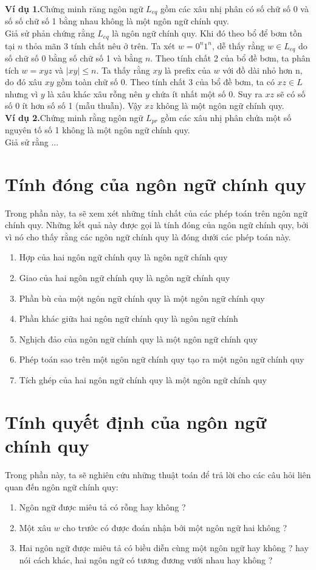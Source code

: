 \documentclass[14pt]{extreport}
\begin{document}
\textbf{Ví dụ 1.}Chứng minh răng ngôn ngữ $L_{eq}$ gồm các xâu nhị phân có số chữ số 0 và số số chữ số 1 bằng nhau không là một ngôn ngữ chính quy. \\
Giả sử phản chứng rằng $L_{eq}$ là ngôn ngữ chính quy. Khi đó theo bổ để bơm tồn tại $n$ thỏa mãn 3 tính chất nêu ở trên. Ta xét $w = 0^n 1^n$, dễ thấy rằng $w \in L_{eq}$ do số chữ số 0 bằng số chữ số 1 và bằng $n$. Theo tính chất 2 của bổ đề bơm, ta phân tích $w = xyz$ và $|xy| \leq n$. Ta thấy rằng $xy$ là prefix của $w$ với đồ dài nhỏ hơn n, do đó xâu $xy$ gồm toàn chữ số 0. Theo tính chất 3 của bổ đề bơm, ta có $xz \in L$ nhưng vì $y$ là xâu khác xâu rỗng nên $y$ chứa ít nhất một số 0. Suy ra $xz$ sẽ có số số 0 ít hơn số số 1 (mẫu thuẫn). Vậy $xz$ không là một ngôn ngữ chính quy.\\

\textbf{Ví dụ 2.}Chứng minh rằng ngôn ngữ $L_{pr}$ gồm các xâu nhị phân chứa một số nguyên tố số 1 không là một ngôn ngữ chính quy. \\
Giả sử rằng ... \\

\section{Tính đóng của ngôn ngữ chính quy}
Trong phần này, ta sẽ xem xét những tính chất của các phép toán trên ngôn ngữ chính quy. Những kết quả này được gọi là tính đóng của ngôn ngữ chính quy, bởi vì nó cho thấy rằng các ngôn ngữ chính quy là đóng dưới các phép toán này.
\begin{enumerate}
\item Hợp của hai ngôn ngữ chính quy là ngôn ngữ chính quy
\item Giao của hai ngôn ngữ chính quy là ngôn ngữ chính quy
\item Phần bù của một ngôn ngữ chính quy là một ngôn ngữ chính quy
\item Phần khác giữa hai ngôn ngữ chính quy là ngôn ngữ chính
\item Nghịch đảo của ngôn ngữ chính quy là một ngôn ngữ chính quy
\item Phép toán sao trên một ngôn ngữ chính quy tạo ra một ngôn ngữ chính quy
\item Tích ghép của hai ngôn ngữ chính quy là một ngôn ngữ chính quy
\end{enumerate}

\section{Tính quyết định của ngôn ngữ chính quy}
Trong phần này, ta sẽ nghiên cứu những thuật toán để trả lời cho các câu hỏi liên quan đến ngôn ngữ chính quy:
\begin{enumerate}
\item Ngôn ngữ được miêu tả có rỗng hay không ?
\item Một xâu $w$ cho trước có được đoán nhận bới một ngôn ngữ hai không ?
\item Hai ngôn ngữ được miêu tả có biều diễn cùng một ngôn ngữ hay không ? hay nói cách khác, hai ngôn ngữ có tương đương vưới nhau hay không ?
\end{enumerate}
\end{document}
